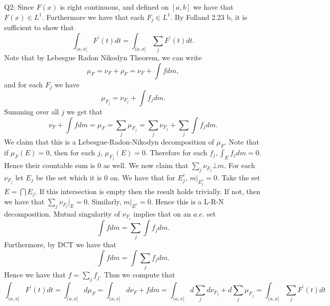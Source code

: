 \documentclass[letterpaper]{article}
\begin{document}
\noindent Q2: Since $F(x)$ is right continuous, and defined on $[a,b]$ we have that $F(x) \in L^1$. Furthermore we have that each $F_j \in L^1$. By Folland 2.23 b, it is sufficient to show that $$ \int_{(a,x]} F^\prime(t) dt  =  \int_{(a,x]} \sum_{j}F^\prime (t) dt. $$
Note that by Lebesgue Radon Nikodyn Theorem, we can write $$\mu_F = \nu_F + \rho_F = \nu_F + \int f dm ,$$ and for each $F_j$ we have $$\mu_{F_j} = \nu_{F_j} + \int f_j dm.$$ Summing over all $j$ we get that $$\nu_F + \int f dm = \mu_F = \sum_{j} \mu_{F_j} = \sum_{j} \nu_{F_j} + \sum_{j} \int f_j dm. $$ 
We claim that this is a Lebesgue-Radon-Nikodyn decomposition of $\mu_F$. Note that if $\mu_F(E)=0$, then for each $j$, $\mu_{F_j}(E) =0$. Therefore for each $f_j, \int_{E} f_j dm =0$. Hence their countable sum is $0$ as well. We now claim that $\sum_{j} \nu_{F_j} \bot m$. For each $\nu_{F_j}$ let $E_j$ be the set which it is $0$ on. We have that for $E_j^c$, $m|_{E_j^c} =0$. 
Take the set $E = \bigcap E_j$. If this intersection is empty then the result holds trivially. If not, then we have that $\sum_{j} \nu_{F_j} |_{E} = 0$. Similarly, $m|_{E^c}= 0$. Hence this is a L-R-N decomposition. 
Mutual singularity of $\nu_{F_i}$ implies that on an $a.e.$ set $$\int f dm = \sum_{j} \int f_j dm.$$ Furthermore, by DCT we have that $$\int f dm = \int \sum_{j} f_j dm.$$ Hence we have that $f = \sum_{j} f_j.$ Thus we compute that $$\int_{(a,x]} F^\prime(t) dt = \int_{(a,x]} d \mu_F = \int_{(a,x]} d \nu_F + f dm = \int_{(a,x]} d \sum_{j} d\nu_{F_j} + d \sum_{j} \mu_{F_j} = \int_{(a,x]} \sum_{j} F^\prime(t) dt $$
\end{document}

